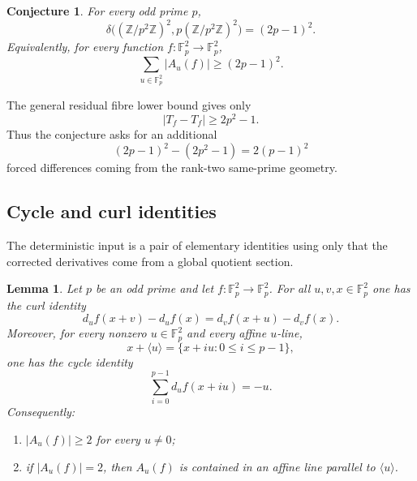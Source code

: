 \documentclass[reqno]{amsart}
\numberwithin{equation}{section}
\newtheorem{lemma}[theorem]{Lemma}
\newtheorem{conjecture}[theorem]{Conjecture}
\theoremstyle{definition}
\begin{document}
\begin{conjecture}
\label{conj:odd-square-plane-box}
For every odd prime $p$,
\[
  \delta\bigl((\mathbb Z/p^2\mathbb Z)^2,
              p(\mathbb Z/p^2\mathbb Z)^2\bigr)=(2p-1)^2.
\]
Equivalently, for every function $f:\mathbb F_p^2\to\mathbb F_p^2$,
\[
  \sum_{u\in\mathbb F_p^2}|A_u(f)|\geq (2p-1)^2.
\]
\end{conjecture}

The general residual fibre lower bound gives only
\[
  |T_f-T_f|\geq 2p^2-1.
\]
Thus the conjecture asks for an additional
\[
  (2p-1)^2-(2p^2-1)=2(p-1)^2
\]
forced differences coming from the rank-two same-prime geometry.

\subsection{Cycle and curl identities}
\label{subsec:cycle-curl-identities}

The deterministic input is a pair of elementary identities using only that the
corrected derivatives come from a global quotient section.
\begin{lemma}
\label{lem:cycle-curl-two-point}
Let $p$ be an odd prime and let $f:\mathbb F_p^2\to\mathbb F_p^2$.  For all
$u,v,x\in\mathbb F_p^2$ one has the curl identity
\[
  d_u f(x+v)-d_u f(x)=d_v f(x+u)-d_v f(x).
\]
Moreover, for every nonzero $u\in\mathbb F_p^2$ and every affine $u$-line,
\[
  x+\langle u\rangle=\{x+iu:0\leq i\leq p-1\},
\]
one has the cycle identity
\[
  \sum_{i=0}^{p-1} d_u f(x+iu)=-u.
\]
Consequently:
\begin{enumerate}
  \item $|A_u(f)|\geq 2$ for every $u\neq 0$;
  \item if $|A_u(f)|=2$, then $A_u(f)$ is contained in an affine line parallel
  to $\langle u\rangle$.
\end{enumerate}
\end{lemma}
\end{document}
